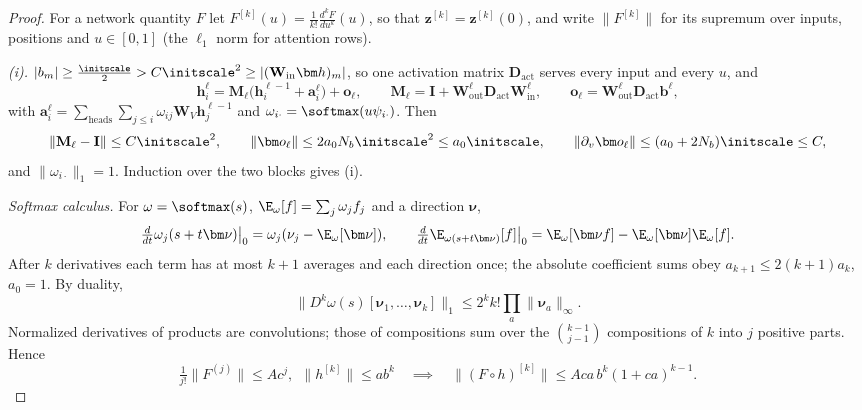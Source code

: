 \begin{proof}
For a network quantity $F$ let $F^{[k]}(u)=\frac{1}{k!}\frac{d^kF}{du^k}(u)$, so that $\bm z^{[k]}=\bm z^{[k]}(0)$, and write $\|F^{[k]}\|$ for its supremum over
inputs, positions and $u\in[0,1]$ (the $\ell_1$ norm for attention rows).

\emph{(i).} $|b_m|\ge\frac{\initscale}{2}>C\initscale^2\ge|(\mathbf W_{\mathrm{in}}\bm h)_m|$, so one activation matrix $\mathbf D_{\mathrm{act}}$ serves every input and every $u$, and
\[
 \bm h_i^\ell=\mathbf M_\ell\bigl(\bm h_i^{\ell-1}+\bm a_i^\ell\bigr)+\bm o_\ell,\qquad \mathbf M_\ell=\mathbf I+\mathbf W^\ell_{\mathrm{out}}\mathbf D_{\mathrm{act}}\mathbf W^\ell_{\mathrm{in}},\qquad \bm o_\ell=\mathbf W^\ell_{\mathrm{out}}\mathbf D_{\mathrm{act}}\bm b^\ell,
\]
with $\bm a_i^\ell=\sum_{\mathrm{heads}}\sum_{j\le i}\omega_{ij}\mathbf W_V\bm h^{\ell-1}_j$ and $\omega_{i\cdot}=\softmax(u\psi_{i\cdot})$. Then
\[
 \|\mathbf M_\ell-\mathbf I\|\le C\initscale^2,\qquad \|\bm o_\ell\|\le2a_0N_b\initscale^2\le a_0\initscale,\qquad \|\partial_v\bm o_\ell\|\le(a_0+2N_b)\initscale\le C,
\]
and $\|\omega_{i\cdot}\|_1=1$. Induction over the two blocks gives (i).

\emph{Softmax calculus.} For $\omega=\softmax(s)$, $\E_\omega[f]=\sum_j\omega_jf_j$ and a direction $\bm\nu$,
\[
 \tfrac{d}{dt}\omega_j(s+t\bm\nu)\big|_0=\omega_j(\nu_j-\E_\omega[\bm\nu]),\qquad
 \tfrac{d}{dt}\E_{\omega(s+t\bm\nu)}[f]\big|_0=\E_\omega[\bm\nu f]-\E_\omega[\bm\nu]\E_\omega[f].
\]
After $k$ derivatives each term has at most $k+1$ averages and each direction once; the absolute coefficient sums obey $a_{k+1}\le2(k+1)a_k$,
$a_0=1$. By duality,
\begin{equation}
 \bigl\|D^k\omega(s)[\bm\nu_1,\ldots,\bm\nu_k]\bigr\|_1\le2^kk!\prod_a\|\bm\nu_a\|_\infty .
 \label{eq:softmax-avg}
\end{equation}
Normalized derivatives of products are convolutions; those of compositions sum over the $\binom{k-1}{j-1}$ compositions of $k$ into $j$
positive parts. Hence
\[
 \tfrac{1}{j!}\|F^{(j)}\|\le Ac^j,\ \ \|h^{[k]}\|\le ab^k\quad\implies\quad\|(F\circ h)^{[k]}\|\le Aca\,b^k(1+ca)^{k-1}.
\]


\end{proof}
